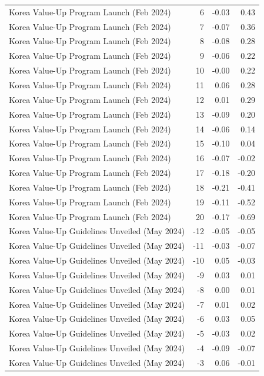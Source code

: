 \begin{table}
\begin{tabular}{lrrr}
Korea Value-Up Program Launch (Feb 2024) & 6 & -0.03 & 0.43 \\
Korea Value-Up Program Launch (Feb 2024) & 7 & -0.07 & 0.36 \\
Korea Value-Up Program Launch (Feb 2024) & 8 & -0.08 & 0.28 \\
Korea Value-Up Program Launch (Feb 2024) & 9 & -0.06 & 0.22 \\
Korea Value-Up Program Launch (Feb 2024) & 10 & -0.00 & 0.22 \\
Korea Value-Up Program Launch (Feb 2024) & 11 & 0.06 & 0.28 \\
Korea Value-Up Program Launch (Feb 2024) & 12 & 0.01 & 0.29 \\
Korea Value-Up Program Launch (Feb 2024) & 13 & -0.09 & 0.20 \\
Korea Value-Up Program Launch (Feb 2024) & 14 & -0.06 & 0.14 \\
Korea Value-Up Program Launch (Feb 2024) & 15 & -0.10 & 0.04 \\
Korea Value-Up Program Launch (Feb 2024) & 16 & -0.07 & -0.02 \\
Korea Value-Up Program Launch (Feb 2024) & 17 & -0.18 & -0.20 \\
Korea Value-Up Program Launch (Feb 2024) & 18 & -0.21 & -0.41 \\
Korea Value-Up Program Launch (Feb 2024) & 19 & -0.11 & -0.52 \\
Korea Value-Up Program Launch (Feb 2024) & 20 & -0.17 & -0.69 \\
Korea Value-Up Guidelines Unveiled (May 2024) & -12 & -0.05 & -0.05 \\
Korea Value-Up Guidelines Unveiled (May 2024) & -11 & -0.03 & -0.07 \\
Korea Value-Up Guidelines Unveiled (May 2024) & -10 & 0.05 & -0.03 \\
Korea Value-Up Guidelines Unveiled (May 2024) & -9 & 0.03 & 0.01 \\
Korea Value-Up Guidelines Unveiled (May 2024) & -8 & 0.00 & 0.01 \\
Korea Value-Up Guidelines Unveiled (May 2024) & -7 & 0.01 & 0.02 \\
Korea Value-Up Guidelines Unveiled (May 2024) & -6 & 0.03 & 0.05 \\
Korea Value-Up Guidelines Unveiled (May 2024) & -5 & -0.03 & 0.02 \\
Korea Value-Up Guidelines Unveiled (May 2024) & -4 & -0.09 & -0.07 \\
Korea Value-Up Guidelines Unveiled (May 2024) & -3 & 0.06 & -0.01 \\

\end{tabular}
\end{table}

